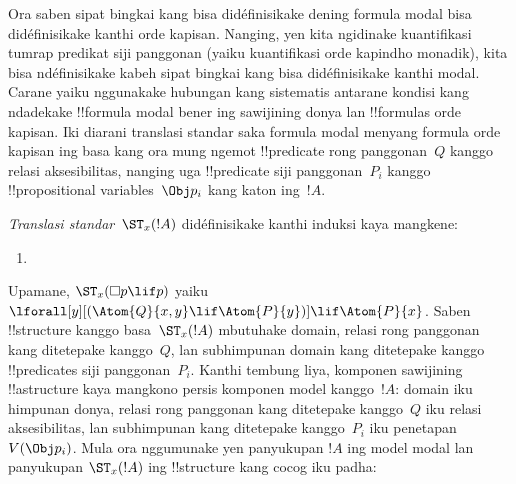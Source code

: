 \documentclass[../../../include/open-logic-section]{subfiles}
\begin{document}


Ora saben sipat bingkai kang bisa didéfinisikake dening formula
modal bisa didéfinisikake kanthi orde kapisan. Nanging, yen kita
ngidinake kuantifikasi tumrap predikat siji panggonan (yaiku
kuantifikasi orde kapindho monadik), kita bisa ndéfinisikake kabeh
sipat bingkai kang bisa didéfinisikake kanthi modal. Carane yaiku
nggunakake hubungan kang sistematis antarane kondisi kang ndadekake
!!{formula} modal bener ing sawijining donya lan !!{formula}s orde
kapisan. Iki diarani translasi standar saka formula modal menyang
formula orde kapisan ing basa kang ora mung ngemot !!{predicate} rong
panggonan~$Q$ kanggo relasi aksesibilitas, nanging uga !!{predicate}
siji panggonan~$P_i$ kanggo !!{propositional variable}s~$\Obj p_i$
kang katon ing~$!A$.

\begin{defn}
  \emph{Translasi standar}~$\ST_x(!A)$ didéfinisikake kanthi
  induksi kaya mangkene:
  \begin{enumerate}
  \item {}
  \end{enumerate}
\end{defn}

Upamane, $\ST_x(\Box p \lif p)$ yaiku $\lforall[y][(\Atom{Q}{x,y}
  \lif \Atom{P}{y})] \lif \Atom{P}{x}$. Saben !!{structure} kanggo
basa~$\ST_x(!A)$ mbutuhake domain, relasi rong panggonan kang
ditetepake kanggo~$Q$, lan subhimpunan domain kang ditetepake kanggo
!!{predicate}s siji panggonan~$P_i$. Kanthi tembung liya, komponen
sawijining !!a{structure} kaya mangkono persis komponen model kanggo~$!A$:
domain iku himpunan donya, relasi rong panggonan kang ditetepake
kanggo~$Q$ iku relasi aksesibilitas, lan subhimpunan kang ditetepake
kanggo~$P_i$ iku penetapan~$V(\Obj p_i)$. Mula ora nggumunake yen
panyukupan $!A$ ing model modal lan panyukupan $\ST_x(!A)$ ing
!!{structure} kang cocog iku padha:
\end{document}

